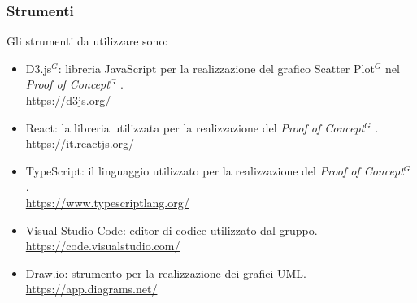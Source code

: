 \setlength\extrarowheight{0pt}

\subsubsection{Strumenti}
Gli strumenti da utilizzare sono:
\begin{itemize}
    \item D3.js$^G$: libreria JavaScript per la realizzazione del grafico Scatter Plot$^G$  nel \textit{Proof of Concept}$^G$ .\\
    \href{https://d3js.org/}{https://d3js.org/}
    \item React: la libreria utilizzata per la realizzazione del \textit{Proof of Concept}$^G$ .\\
    \href{https://it.reactjs.org/}{https://it.reactjs.org/}
    \item TypeScript: il linguaggio utilizzato per la realizzazione del \textit{Proof of Concept}$^G$ .\\
    \href{https://www.typescriptlang.org/}{https://www.typescriptlang.org/}
    \item Visual Studio Code: editor di codice utilizzato dal gruppo. \\
    \href{https://code.visualstudio.com/}{https://code.visualstudio.com/}
    \item Draw.io: strumento per la realizzazione dei grafici UML.\\
    \href{https://app.diagrams.net/}{https://app.diagrams.net/}
\end{itemize}
